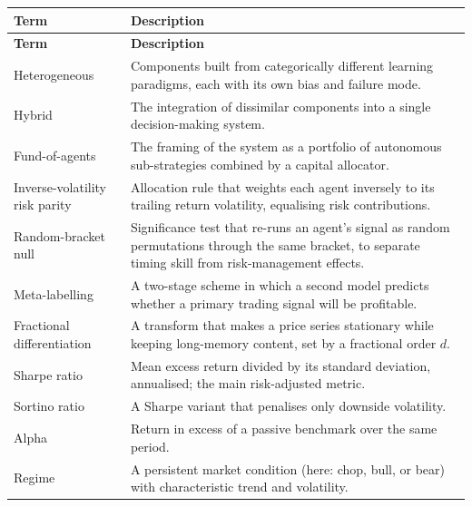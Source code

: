 \begin{onehalfspacing}
\renewcommand{\arraystretch}{1.2}
\small
\begin{longtable}{@{}l >{\raggedright\arraybackslash\hyphenpenalty=10000\exhyphenpenalty=10000}p{10.2cm}@{}}
\toprule
\textbf{Term} & \textbf{Description} \\
\midrule
\endfirsthead
\toprule
\textbf{Term} & \textbf{Description} \\
\midrule
\endhead
Heterogeneous & Components built from categorically different learning paradigms, each with its own bias and failure mode. \\
Hybrid & The integration of dissimilar components into a single decision-making system. \\
Fund-of-agents & The framing of the system as a portfolio of autonomous sub-strategies combined by a capital allocator. \\
Inverse-volatility risk parity & Allocation rule that weights each agent inversely to its trailing return volatility, equalising risk contributions. \\
Random-bracket null & Significance test that re-runs an agent's signal as random permutations through the same bracket, to separate timing skill from risk-management effects. \\
Meta-labelling & A two-stage scheme in which a second model predicts whether a primary trading signal will be profitable. \\
Fractional differentiation & A transform that makes a price series stationary while keeping long-memory content, set by a fractional order $d$. \\
Sharpe ratio & Mean excess return divided by its standard deviation, annualised; the main risk-adjusted metric. \\
Sortino ratio & A Sharpe variant that penalises only downside volatility. \\
Alpha & Return in excess of a passive benchmark over the same period. \\
Regime & A persistent market condition (here: chop, bull, or bear) with characteristic trend and volatility. \\
\bottomrule
\end{longtable}

\end{onehalfspacing}
